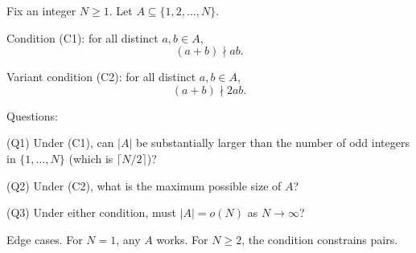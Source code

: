 Fix an integer $N\ge 1$.
Let $A\subseteq\{1,2,\dots,N\}$.

Condition (C1): for all distinct $a,b\in A$,
\[
(a+b)\nmid ab.
\]

Variant condition (C2): for all distinct $a,b\in A$,
\[
(a+b)\nmid 2ab.
\]

Questions:

(Q1) Under (C1), can $|A|$ be substantially larger than the number of odd integers in $\{1,\dots,N\}$ (which is $\lceil N/2\rceil$)?

(Q2) Under (C2), what is the maximum possible size of $A$?

(Q3) Under either condition, must $|A|=o(N)$ as $N\to\infty$?

Edge cases.
For $N=1$, any $A$ works. For $N\ge 2$, the condition constrains pairs.
